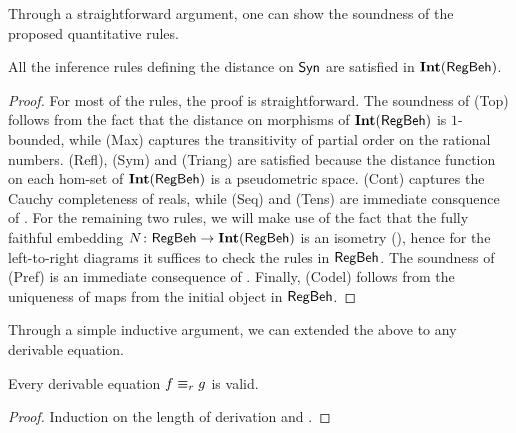 Through a straightforward argument, one can show the soundness of the proposed quantitative rules.
\begin{lemma}\label{lem:soundness_sublemma}
		All the inference rules defining the distance on $\mathsf{Syn}$ are satisfied in $\mathbf{Int}(\mathsf{RegBeh})$.
	\end{lemma}
	\begin{proof}
		For most of the rules, the proof is straightforward. The soundness of \textsf{(Top)} follows from the fact that the distance on morphisms of $\mathbf{Int}(\mathsf{RegBeh})$ is $1$-bounded, while \textsf{(Max)} captures the transitivity of partial order on the rational numbers. \textsf{(Refl)}, \textsf{(Sym)} and \textsf{(Triang)} are satisfied because the distance function on each hom-set of $\mathbf{Int}(\mathsf{RegBeh})$ is a pseudometric space. \textsf{(Cont)} captures the Cauchy completeness of reals, while \textsf{(Seq)} and \textsf{(Tens)} are immediate consquence of . For the remaining two rules, we will make use of the fact that the fully faithful embedding $N \colon \mathsf{RegBeh} \to \mathbf{Int}(\mathsf{RegBeh})$ is an isometry (), hence for the left-to-right diagrams it suffices to check the rules in $\mathsf{RegBeh}$. The soundness of \textsf{(Pref)} is an immediate consequence of . Finally, \textsf{(Codel)} follows from the uniqueness of maps from the initial object in $\mathsf{RegBeh}$.
		\end{proof}
		Through a simple inductive argument, we can extended the above to any derivable equation.
\begin{theorem}\label{c3:thm:soundness}
Every derivable equation $f \equiv_{r} g$ is valid.
\end{theorem}
\begin{proof}
	Induction on the length of derivation and .
\end{proof}
